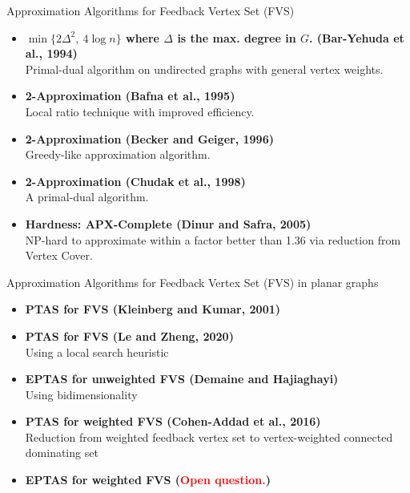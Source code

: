\documentclass{beamer}
\begin{document}
\begin{frame}{Approximation Algorithms for Feedback Vertex Set (FVS)}

\begin{itemize}
    \item \textbf{$\min\{2\Delta^2,\ 4 \log n\}$ where $\Delta$ is the max. degree in $G$. (Bar-Yehuda et al., 1994)}\\
    \small Primal-dual algorithm on undirected graphs with general vertex weights.

    \item \textbf{2-Approximation (Bafna et al., 1995)}\\
    \small Local ratio technique with improved efficiency.
    
    \item \textbf{2-Approximation (Becker and Geiger, 1996)}\\
    \small Greedy-like approximation algorithm.

    \item \textbf{2-Approximation (Chudak et al., 1998)}\\
    \small A primal-dual algorithm.
    
\end{itemize}

\begin{itemize}
  \item \textbf{Hardness: APX-Complete (Dinur and Safra, 2005)}\\
    \small NP-hard to approximate within a factor better than 1.36 via reduction from Vertex Cover.
\end{itemize}

\end{frame}

\begin{frame}{Approximation Algorithms for Feedback Vertex Set (FVS) in planar graphs}

\begin{itemize}
    \item \textbf{PTAS for FVS (Kleinberg and Kumar, 2001)}
    \item \textbf{PTAS for FVS (Le and Zheng, 2020)}\\
    \small Using a local search heuristic
    \item \textbf{EPTAS for unweighted FVS (Demaine and Hajiaghayi)}\\
    \small Using bidimensionality
    \item \textbf{PTAS for weighted FVS (Cohen-Addad et al., 2016)}\\
    \small Reduction from weighted feedback vertex set
 to vertex-weighted connected dominating set
    \item \textbf{EPTAS for weighted FVS (\textcolor{red}{Open question.})}
\end{itemize}

\end{frame}
\end{document}
